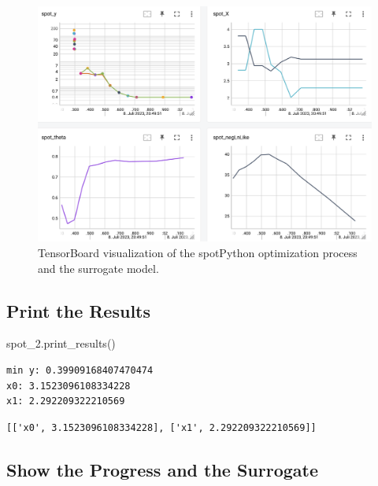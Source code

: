 \documentclass[
  letterpaper,
  DIV=11,
  numbers=noendperiod]{scrreprt}
\newenvironment{Shaded}{\begin{snugshade}}{\end{snugshade}}
\newcommand{\NormalTok}[1]{\textcolor[rgb]{0.00,0.23,0.31}{#1}}
\begin{document}
\begin{figure}

{\centering \includegraphics[width=1\textwidth,height=\textheight]{figures_static/04_tensorboard_01.png}

}

\caption{TensorBoard visualization of the spotPython optimization
process and the surrogate model.}

\end{figure}

\hypertarget{print-the-results-2}{%
\subsection{Print the Results}\label{print-the-results-2}}

\begin{Shaded}
\begin{Highlighting}[]
\NormalTok{spot\_2.print\_results()}
\end{Highlighting}
\end{Shaded}

\begin{verbatim}
min y: 0.39909168407470474
x0: 3.1523096108334228
x1: 2.292209322210569
\end{verbatim}

\begin{verbatim}
[['x0', 3.1523096108334228], ['x1', 2.292209322210569]]
\end{verbatim}

\hypertarget{show-the-progress-and-the-surrogate}{%
\subsection{Show the Progress and the
Surrogate}\label{show-the-progress-and-the-surrogate}}
\end{document}
